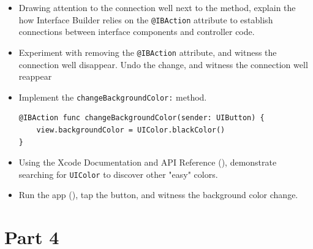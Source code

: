 \documentclass[a4paper,11pt]{scrartcl}
\begin{document}
\begin{itemize}
\begin{lstlisting}
}
\end{lstlisting}
\item Drawing attention to the connection well next to the method, explain the how Interface Builder relies on the \texttt{@IBAction} attribute to establish connections between interface components and controller code.
\item Experiment with removing the \texttt{@IBAction} attribute, and witness the connection well disappear. Undo the change, and witness the connection well reappear 
\item Implement the \texttt{changeBackgroundColor:} method.
\begin{lstlisting}
@IBAction func changeBackgroundColor(sender: UIButton) {
	view.backgroundColor = UIColor.blackColor()
}
\end{lstlisting}
\item Using the Xcode Documentation and API Reference (), demonstrate searching for \texttt{UIColor} to discover other "easy" colors.
\item Run the app (), tap the button, and witness the background color change.
\end{itemize}

\section*{Part 4}
\end{document}
